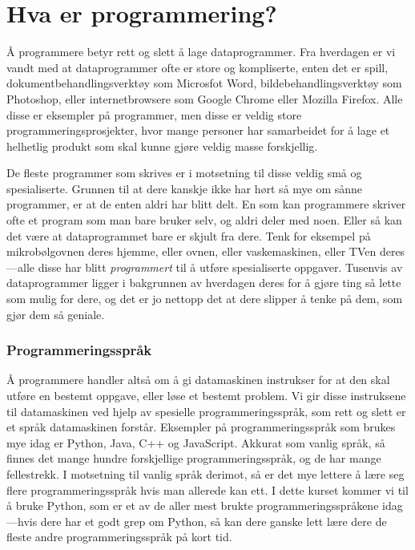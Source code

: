 \documentclass[a4paper, 11pt, notitlepage]{article}
\begin{document}
\clearpage

\section*{Hva er programmering?}

Å programmere betyr rett og slett å lage dataprogrammer. Fra hverdagen er vi vandt med at dataprogrammer ofte er store og kompliserte, enten det er spill, dokumentbehandlingsverktøy som Microsfot Word, bildebehandlings\-verktøy som Photoshop, eller internetbrowsere som Google Chrome eller Mozilla Firefox. Alle disse er eksempler på programmer, men disse er veldig store programmerings\-prosjekter, hvor mange personer har samarbeidet for å lage et helhetlig produkt som skal kunne gjøre veldig masse forskjellig.

De fleste programmer som skrives er i motsetning til disse veldig små og spesialiserte. Grunnen til at dere kanskje ikke har hørt så mye om sånne programmer, er at de enten aldri har blitt delt. En som kan programmere skriver ofte et program som man bare bruker selv, og aldri deler med noen. Eller så kan det være at dataprogrammet bare er skjult fra dere. Tenk for eksempel på mikrobølgovnen deres hjemme, eller ovnen, eller vaskemaskinen, eller TVen deres---alle disse har blitt \emph{programmert} til å utføre spesialiserte oppgaver. Tusenvis av dataprogrammer ligger i bakgrunnen av hverdagen deres for å gjøre ting så lette som mulig for dere, og det er jo nettopp det at dere slipper å tenke på dem, som gjør dem så geniale.

\subsubsection*{Programmeringsspråk}

Å programmere handler altså om å gi datamaskinen instrukser for at den skal utføre en bestemt oppgave, eller løse et bestemt problem. Vi gir disse instruksene til datamaskinen ved hjelp av spesielle programmeringsspråk, som rett og slett er et språk datamaskinen forstår. Eksempler på programmeringsspråk som brukes mye idag er Python, Java, C++ og JavaScript. Akkurat som vanlig språk, så finnes det mange hundre forskjellige programmeringsspråk, og de har mange fellestrekk. I motsetning til vanlig språk derimot, så er det mye lettere å lære seg flere programmeringsspråk hvis man allerede kan ett. I dette kurset kommer vi til å bruke Python, som er et av de aller mest brukte programmeringsspråkene idag---hvis dere har et godt grep om Python, så kan dere ganske lett lære dere de fleste andre programmeringsspråk på kort tid.
\end{document}
